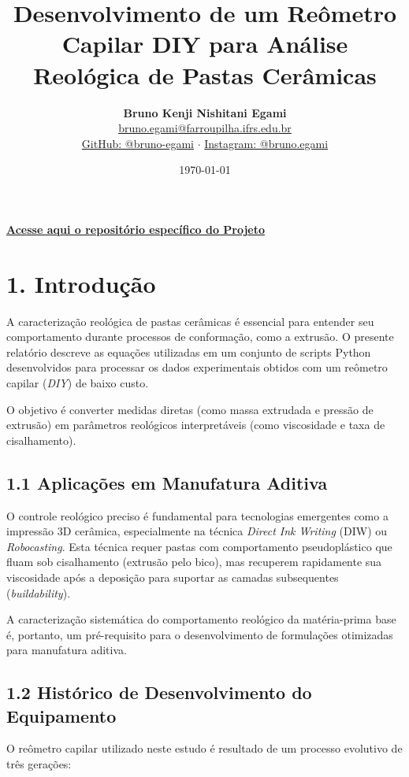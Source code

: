 \documentclass[a4paper,12pt]{article}
\title{Desenvolvimento de um Reômetro Capilar DIY para Análise Reológica de Pastas Cerâmicas}
\author{
    \textbf{Bruno Kenji Nishitani Egami} \\
    \small \href{mailto:bruno.egami@farroupilha.ifrs.edu.br}{bruno.egami@farroupilha.ifrs.edu.br} \\
    \small \href{https://github.com/bruno-egami}{GitHub: @bruno-egami} $\cdot$ 
    \href{https://www.instagram.com/bruno.egami/}{Instagram: @bruno.egami}
}
\date{\today}
\begin{document}
\maketitle

\noindent
\href{https://github.com/bruno-egami/Reometro_Capilar/tree/Reometro-capilar-Transdutor_Pasta}{\textbf{Acesse aqui o repositório específico do Projeto}}

\section*{1. Introdução}
A caracterização reológica de pastas cerâmicas é essencial para entender seu comportamento durante processos de conformação, como a extrusão. O presente relatório descreve as equações utilizadas em um conjunto de scripts Python desenvolvidos para processar os dados experimentais obtidos com um reômetro capilar (\textit{DIY}) de baixo custo.

O objetivo é converter medidas diretas (como massa extrudada e pressão de extrusão) em parâmetros reológicos interpretáveis (como viscosidade e taxa de cisalhamento).

\subsection*{1.1 Aplicações em Manufatura Aditiva}
O controle reológico preciso é fundamental para tecnologias emergentes como a impressão 3D cerâmica, especialmente na técnica \textit{Direct Ink Writing} (DIW) ou \textit{Robocasting}. Esta técnica requer pastas com comportamento pseudoplástico que fluam sob cisalhamento (extrusão pelo bico), mas recuperem rapidamente sua viscosidade após a deposição para suportar as camadas subsequentes (\textit{buildability}).

A caracterização sistemática do comportamento reológico da matéria-prima base é, portanto, um pré-requisito para o desenvolvimento de formulações otimizadas para manufatura aditiva.

\subsection*{1.2 Histórico de Desenvolvimento do Equipamento}
O reômetro capilar utilizado neste estudo é resultado de um processo evolutivo de três gerações:
\end{document}
